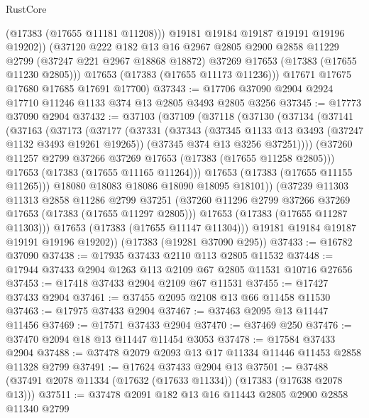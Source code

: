 \begin{lexlean}{RustCore}
\begin{coremodule}
              (@17383 (@17655 @11181 @11208)))
            @19181
            @19184
            @19187
            @19191
            @19196
            @19202))
        (@37120
          @222
          @182
          @13
          @16
          @2967
          @2805
          @2900
          @2858
          @11229
          @2799
          (@37247 @221 @2967 @18868 @18872)
          @37269
          @17653
          (@17383 (@17655 @11230 @2805)))
        @17653
        (@17383 (@17655 @11173 @11236)))
      @17671
      @17675
      @17680
      @17685
      @17691
      @17700)
@37343 := @17706 @37090 @2904 @2924 @17710 @11246 @1133 @374 @13 @2805 @3493 @2805 @3256
@37345 := @17773 @37090 @2904
@37432 := @37103
    (@37109
      (@37118
        (@37130
          (@37134
            (@37141
              (@37163
                (@37173
                  (@37177
                    (@37331
                      (@37343
                        (@37345 @1133 @13 @3493 (@37247 @1132 @3493 @19261 @19265))
                        (@37345 @374 @13 @3256 @37251))))
                  (@37260 @11257 @2799 @37266 @37269 @17653 (@17383 (@17655 @11258 @2805)))
                  @17653
                  (@17383 (@17655 @11165 @11264)))
                @17653
                (@17383 (@17655 @11155 @11265)))
              @18080
              @18083
              @18086
              @18090
              @18095
              @18101))
          (@37239
            @11303
            @11313
            @2858
            @11286
            @2799
            @37251
            (@37260 @11296 @2799 @37266 @37269 @17653 (@17383 (@17655 @11297 @2805)))
            @17653
            (@17383 (@17655 @11287 @11303)))
          @17653
          (@17383 (@17655 @11147 @11304)))
        @19181
        @19184
        @19187
        @19191
        @19196
        @19202))
    (@17383 (@19281 @37090 @295))
@37433 := @16782 @37090
@37438 := @17935 @37433 @2110 @113 @2805 @11532
@37448 := @17944 @37433 @2904 @1263 @113 @2109 @67 @2805 @11531 @10716 @27656
@37453 := @17418 @37433 @2904 @2109 @67 @11531
@37455 := @17427 @37433 @2904
@37461 := @37455 @2095 @2108 @13 @66 @11458 @11530
@37463 := @17975 @37433 @2904
@37467 := @37463 @2095 @13 @11447 @11456
@37469 := @17571 @37433 @2904
@37470 := @37469 @250
@37476 := @37470 @2094 @18 @13 @11447 @11454 @3053
@37478 := @17584 @37433 @2904
@37488 := @37478 @2079 @2093 @13 @17 @11334 @11446 @11453 @2858 @11328 @2799
@37491 := @17624 @37433 @2904 @13
@37501 := @37488 (@37491 @2078 @11334 (@17632 (@17633 @11334)) (@17383 (@17638 @2078 @13)))
@37511 := @37478 @2091 @182 @13 @16 @11443 @2805 @2900 @2858 @11340 @2799

\end{coremodule}
\end{lexlean}

